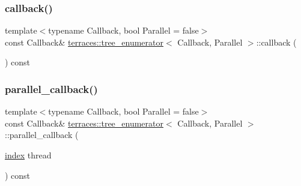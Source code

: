 \subsubsection{\texorpdfstring{callback()}{callback()}}
{\footnotesize\ttfamily template$<$typename Callback, bool Parallel = false$>$ \\
const Callback\& \hyperlink{classterraces_1_1tree__enumerator}{terraces\+::tree\+\_\+enumerator}$<$ Callback, Parallel $>$\+::callback (\begin{DoxyParamCaption}{ }\end{DoxyParamCaption}) const\hspace{0.3cm}{\ttfamily [inline]}}

\mbox{\label{classterraces_1_1tree__enumerator_a21af6b1b63002d05ce90f8100521d858}} 
\subsubsection{\texorpdfstring{parallel\+\_\+callback()}{parallel\_callback()}}
{\footnotesize\ttfamily template$<$typename Callback, bool Parallel = false$>$ \\
const Callback\& \hyperlink{classterraces_1_1tree__enumerator}{terraces\+::tree\+\_\+enumerator}$<$ Callback, Parallel $>$\+::parallel\+\_\+callback (\begin{DoxyParamCaption}\item[{\hyperlink{namespaceterraces_adbc33ccb543d1634e96d0eb02e472c77}{index}}]{thread }\end{DoxyParamCaption}) const\hspace{0.3cm}{\ttfamily [inline]}}

\mbox{\label{classterraces_1_1tree__enumerator_ae523d14dfc46be4015d4ba5993f4c2ba}} 
